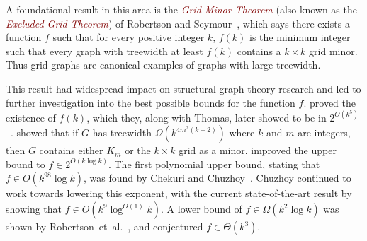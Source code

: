 \documentclass{patmorin}
\newcommand{\defn}[1]{\textcolor{Maroon}{\emph{#1}}}
\renewcommand{\geq}{\geqslant}
\DeclareMathOperator{\tw}{tw}
\DeclareMathOperator{\gm}{gm}
\theoremstyle{plain}
\theoremstyle{definition}
\begin{document}


A foundational result in this area is the \defn{Grid Minor Theorem} (also known as the \defn{Excluded Grid Theorem}) of Robertson and Seymour~\cite{RS-V}, which says there exists a function $f$ such that for every positive integer $k$, $f(k)$ is the minimum integer such that every graph with treewidth at least $f(k)$ contains a $k \times k$ grid minor.  Thus grid graphs are canonical examples of graphs with large treewidth. 

This result had widespread impact on structural graph theory research and led to further investigation into the best possible bounds for the function $f$. \citet{RS-V} proved the existence of $f(k)$, which they, along with Thomas, later showed to be in $2^{O(k^5)}$~\cite{RST-JCTB94}. \citet{DJGT-JCTB99} showed that if $G$ has treewidth $\Omega(k^{4m^2(k+2)})$ where $k$ and $m$ are integers, then $G$ contains either $K_m$ or the $k \times k$ grid as a minor. \citet{LeafSeymour15} improved the upper bound to $f\in 2^{O(k \log k)}$.  
The first polynomial upper bound, stating that $f \in O(k^{98}\log k)$, was found by Chekuri and Chuzhoy~\cite{CC16}. Chuzhoy continued to work towards lowering this exponent, with the current state-of-the-art result by \citet{CT21} showing that $f \in O(k^9\log^{O(1)}k)$. A lower bound of $f\in \Omega(k^2\log k)$ was shown by Robertson~et~al.~\cite{RST-JCTB94}, and \citet{DHK-Algo09} conjectured $f\in \Theta(k^3)$. 
\end{document}
